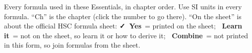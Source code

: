 \label{ess:fs:chap}

\newcommand\essfsYes{\textcolor{hscformula}{\footnotesize\bfseries\faCheck\ Yes}}
\newcommand\essfsNo{\textcolor{hscmistake}{\footnotesize\bfseries\faTimes\ Learn it}}
\newcommand\essfsComb{\textcolor{hsctiptext}{\footnotesize\bfseries\faLink\ Combine}}
\newcommand\essfspad[1]{\raisebox{0pt}[\dimexpr\height+0.9ex\relax][\dimexpr\depth+0.7ex\relax]{#1}}
\newcommand\essfsrow[4]{\rule[-1.3ex]{0pt}{4.0ex}\essfspad{#2} & #3 & #1 &
  \hyperref[ch#4:chap]{\textcolor{hscbrand}{\bfseries #4}}\\\hline}
\newcommand\essfsnext{\noalign{\vskip-\arrayrulewidth}\arrayrulecolor{hscbrand}%
  \specialrule{0.7pt}{0pt}{0pt}\arrayrulecolor{hscrule}}
\newcommand\essfshead{\colhead{Formula} & \colhead{What it is for} &
  \colhead{On the sheet} & \colhead{Ch}}

Every formula used in these Essentials, in chapter order. Use SI units in every formula.
``Ch'' is the chapter (click the number to go there). ``On the sheet'' is about the
official HSC formula sheet: \essfsYes\ = printed on the sheet; \essfsNo\ = not on the
sheet, so learn it or how to derive it; \essfsComb\ = not printed in this form, so join
formulas from the sheet.
\par\smallskip

